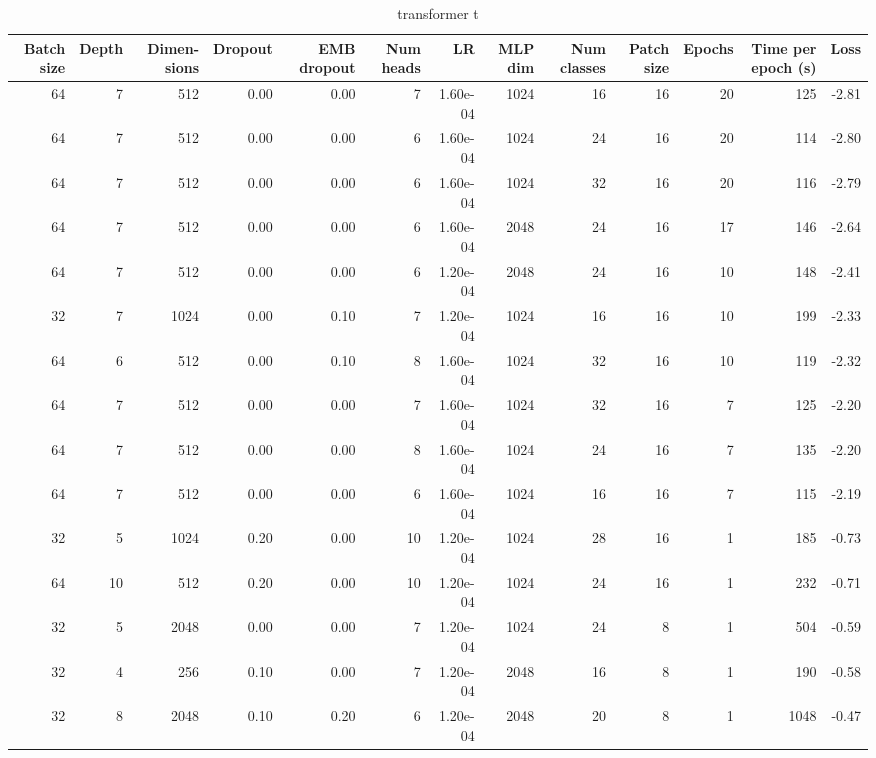 \begin{appendices}
\begin{table}
\caption{transformer t}
\begin{tabular}{rrrrrrrrrrrrr}
\toprule
\multicolumn{1}{p{0.5cm}}{\raggedleft Batch size} & 
\multicolumn{1}{p{0.5cm}}{\raggedleft Depth} & 
\multicolumn{1}{p{1.0cm}}{\raggedleft Dimen-sions} & 
\multicolumn{1}{p{1.0cm}}{\raggedleft Dropout} & 
\multicolumn{1}{p{1.0cm}}{\raggedleft EMB dropout} & 
\multicolumn{1}{p{1.0cm}}{\raggedleft Num heads} & 
\multicolumn{1}{p{0.5cm}}{\raggedleft LR} & 
\multicolumn{1}{p{0.5cm}}{\raggedleft MLP dim} & 
\multicolumn{1}{p{1.0cm}}{\raggedleft Num classes} & 
\multicolumn{1}{p{1.0cm}}{\raggedleft Patch size} & 
\multicolumn{1}{p{1.0cm}}{\raggedleft Epochs} & 
\multicolumn{1}{p{1.5cm}}{\raggedleft Time per epoch (s)} & 
\multicolumn{1}{p{0.5cm}}{\raggedleft Loss} \\
\midrule
64 & 7 & 512 & 0.00 & 0.00 & 7 & 1.60e-04 & 1024 & 16 & 16 & 20 & 125 & -2.81 \\
64 & 7 & 512 & 0.00 & 0.00 & 6 & 1.60e-04 & 1024 & 24 & 16 & 20 & 114 & -2.80 \\
64 & 7 & 512 & 0.00 & 0.00 & 6 & 1.60e-04 & 1024 & 32 & 16 & 20 & 116 & -2.79 \\
64 & 7 & 512 & 0.00 & 0.00 & 6 & 1.60e-04 & 2048 & 24 & 16 & 17 & 146 & -2.64 \\
64 & 7 & 512 & 0.00 & 0.00 & 6 & 1.20e-04 & 2048 & 24 & 16 & 10 & 148 & -2.41 \\
32 & 7 & 1024 & 0.00 & 0.10 & 7 & 1.20e-04 & 1024 & 16 & 16 & 10 & 199 & -2.33 \\
64 & 6 & 512 & 0.00 & 0.10 & 8 & 1.60e-04 & 1024 & 32 & 16 & 10 & 119 & -2.32 \\
64 & 7 & 512 & 0.00 & 0.00 & 7 & 1.60e-04 & 1024 & 32 & 16 & 7 & 125 & -2.20 \\
64 & 7 & 512 & 0.00 & 0.00 & 8 & 1.60e-04 & 1024 & 24 & 16 & 7 & 135 & -2.20 \\
64 & 7 & 512 & 0.00 & 0.00 & 6 & 1.60e-04 & 1024 & 16 & 16 & 7 & 115 & -2.19 \\
\midrule
32 & 5 & 1024 & 0.20 & 0.00 & 10 & 1.20e-04 & 1024 & 28 & 16 & 1 & 185 & -0.73 \\
64 & 10 & 512 & 0.20 & 0.00 & 10 & 1.20e-04 & 1024 & 24 & 16 & 1 & 232 & -0.71 \\
32 & 5 & 2048 & 0.00 & 0.00 & 7 & 1.20e-04 & 1024 & 24 & 8 & 1 & 504 & -0.59 \\
32 & 4 & 256 & 0.10 & 0.00 & 7 & 1.20e-04 & 2048 & 16 & 8 & 1 & 190 & -0.58 \\
32 & 8 & 2048 & 0.10 & 0.20 & 6 & 1.20e-04 & 2048 & 20 & 8 & 1 & 1048 & -0.47 \\

\end{tabular}
\end{table}
\end{appendices}
